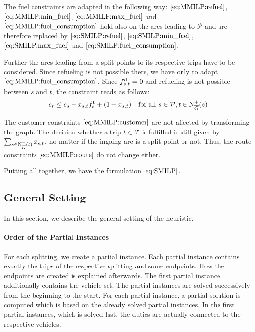The fuel constraints are adapted in the following way: $\eqref{eq:MMILP:refuel}$, $\eqref{eq:MMILP:min_fuel}$, $\eqref{eq:MMILP:max_fuel}$ and $\eqref{eq:MMILP:fuel_consumption}$ hold also on the arcs leading to $\mathcal{P}$ and are therefore replaced by $\eqref{eq:SMILP:refuel}$, $\eqref{eq:SMILP:min_fuel}$, $\eqref{eq:SMILP:max_fuel}$ and $\eqref{eq:SMILP:fuel_consumption}$.

Further the arcs leading from a split points to its respective trips have to be considered. Since refueling is not possible there, we have only to adapt $\eqref{eq:MMILP:fuel_consumption}$. Since $f^{\operatorname{d}}_{s,t} = 0$ and refueling is not possible between $s$ and $t$, the constraint reads as follows:
\begin{align}
	e_t \leq e_s - x_{s,t}f^{\operatorname{t}}_t + \left(1-x_{s,t}\right) && \text{for all } s\in \mathcal{P},t\in\operatorname{N}_{\overline{G}}^+(s) \label{eq:SMILP:fuel_splitpoint}
\end{align}

The customer constraints $\eqref{eq:MMILP:customer}$ are not affected by transforming the graph. The decision whether a trip $t\in\mathcal{T}$ is fulfilled is still given by $\sum_{s\in\operatorname{N}_{\overline{G}}^-(t)} x_{s,t}$, no matter if the ingoing arc is a split point or not. Thus, the route constraints $\eqref{eq:MMILP:route}$ do not change either.

Putting all together, we have the formulation $\eqref{eq:SMILP}$.


\subsection{General Setting}
\label{sec:general_setting}

In this section, we describe the general setting of the heuristic.

\paragraph{Order of the Partial Instances} \parfill

For each splitting, we create a partial instance. Each partial instance contains exactly the trips of the respective splitting and some endpoints. How the endpoints are created is explained afterwards. The first partial instance additionally contains the vehicle set. The partial instances are solved successively from the beginning to the start. For each partial instance, a partial solution is computed which is based on the already solved partial instances. In the first partial instances, which is solved last, the duties are actually connected to the respective vehicles.

